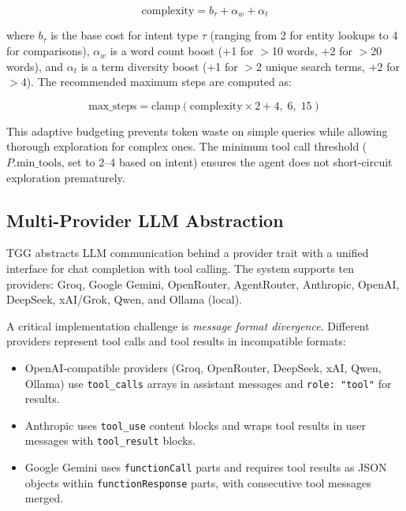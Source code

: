 \documentclass[conference]{IEEEtran}
\begin{document}
\begin{equation}
\text{complexity} = b_\tau + \alpha_w + \alpha_t
\end{equation}

\noindent where $b_\tau$ is the base cost for intent type $\tau$ (ranging from 2 for entity lookups to 4 for comparisons), $\alpha_w$ is a word count boost (+1 for $>$10 words, +2 for $>$20 words), and $\alpha_t$ is a term diversity boost (+1 for $>$2 unique search terms, +2 for $>$4). The recommended maximum steps are computed as:

\begin{equation}
\text{max\_steps} = \text{clamp}(\text{complexity} \times 2 + 4, \; 6, \; 15)
\end{equation}

This adaptive budgeting prevents token waste on simple queries while allowing thorough exploration for complex ones. The minimum tool call threshold ($P.\text{min\_tools}$, set to 2--4 based on intent) ensures the agent does not short-circuit exploration prematurely.

\subsection{Multi-Provider LLM Abstraction}

TGG abstracts LLM communication behind a provider trait with a unified interface for chat completion with tool calling. The system supports ten providers: Groq, Google Gemini, OpenRouter, AgentRouter, Anthropic, OpenAI, DeepSeek, xAI/Grok, Qwen, and Ollama (local).

A critical implementation challenge is \textit{message format divergence}. Different providers represent tool calls and tool results in incompatible formats:

\begin{itemize}
    \item OpenAI-compatible providers (Groq, OpenRouter, DeepSeek, xAI, Qwen, Ollama) use \texttt{tool\_calls} arrays in assistant messages and \texttt{role: "tool"} for results.
    \item Anthropic uses \texttt{tool\_use} content blocks and wraps tool results in user messages with \texttt{tool\_result} blocks.
    \item Google Gemini uses \texttt{functionCall} parts and requires tool results as JSON objects within \texttt{functionResponse} parts, with consecutive tool messages merged.
\end{itemize}
\end{document}
